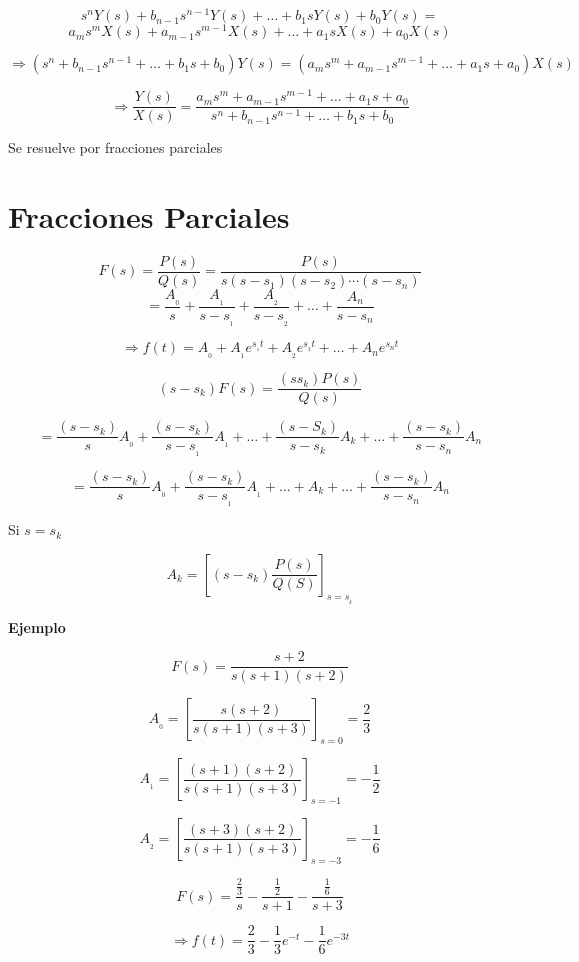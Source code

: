 $$s^{n}Y(s) + b_{n - 1}s^{n - 1}Y(s) + \ldots + b_{1}sY(s) + b_{0}Y(s) = $$
$$a_{m}s^{m}X(s) + a_{m - 1}s^{m - 1}X(s) + \ldots + a_{1}sX(s) + a_{0}X(s)$$

$$\Rightarrow (s^n + b_{n - 1} s^{n -1} + \ldots + b_{1}s + b_{0}) Y(s) = (a_{m}s^m + a_{m - 1}s^{m - 1} + \ldots + a_{1}s + a_{0})X(s)$$

$$\Rightarrow \dfrac{Y(s)}{X(s)} = \dfrac{a_{m}s^m + a_{m - 1}s^{m - 1} + \ldots + a_{1}s + a_{0}}{s^n + b_{n - 1} s^{n -1} + \ldots + b_{1}s + b_{0}}$$

Se resuelve por fracciones parciales

\section{Fracciones Parciales}

$$F(s) = \dfrac{P(s)}{Q(s)} = \dfrac{P(s)}{s(s - s_{1})(s - s_{2})\cdots (s - s_{n})}$$
$$= \dfrac{A_{_0}}{s} + \dfrac{A_{_1}}{s - s_{_1}} + \dfrac{A_{_2}}{s - s_{_2}} + \ldots 
+ \dfrac{A_{n}}{s - s_{n}}$$

$$\Rightarrow f(t) = A_{_0} + A_{_1}e^{s_{_1} t} + A_{_2}e^{s_{_2} t} + \ldots + A_{n}e^{s_{n} t}$$

$$(s - s_{k})F(s) = \dfrac{(s  s_{k})P(s)}{Q(s)}$$

$$= \dfrac{(s - s_{k})}{s}A_{_0} +\dfrac{(s - s_{k})}{s - s_{_1}}A_{_1} + \ldots + \dfrac{(s - S_{k})}{s - s_{k}}A_{k} + \ldots + 
			\dfrac{(s - s_{k})}{s - s_{n}}A_{n}$$

$$= \dfrac{(s - s_{k})}{s}A_{_0} +\dfrac{(s - s_{k})}{s - s_{_1}}A_{_1} + \ldots + A_{k} + \ldots + 
\dfrac{(s - s_{k})}{s - s_{n}}A_{n}$$

Si $s = s_{k}$

$$ A_{k} = \left[ (s - s_{k}) \dfrac{P(s)}{Q(S)} \right]_{s = s_{_k}} $$

\textbf{Ejemplo}

$$F(s) = \dfrac{s + 2}{s(s + 1)(s + 2)}$$

$$A_{_0} = \left[ \dfrac{s(s + 2)}{s(s + 1)(s + 3)} \right]_{s = 0} = \dfrac{2}{3} $$

$$A_{_1} = \left[ \dfrac{(s + 1)(s + 2)}{s(s + 1)(s + 3)} \right]_{s = -1} = - \dfrac{1}{2} $$

$$A_{_2} = \left[ \dfrac{(s + 3)(s + 2)}{s(s + 1)(s + 3)} \right]_{s = -3} = - \dfrac{1}{6} $$

$$F(s) = \dfrac{\frac{2}{3}}{s} - \dfrac{\frac{1}{2}}{s + 1} - \dfrac{\frac{1}{6}}{s + 3}$$

$$\Rightarrow f(t) = \dfrac{2}{3} - \dfrac{1}{3} e^{-t} - \dfrac{1}{6} e^{-3t}$$

